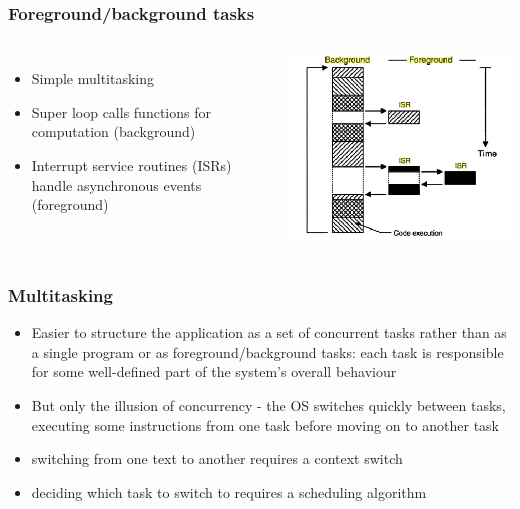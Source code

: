 \documentclass[hyperref={pdfpagelabels=false},svgnames]{beamer}
\begin{document}
\begin{frame}
\frametitle{Foreground/background tasks}
\begin{columns}[c]
\begin{itemize}
\item Simple multitasking
\item Super loop calls functions
for computation (background)
\item Interrupt service routines (ISRs) handle
asynchronous events (foreground)
\end{itemize}
\includegraphics[width=\textwidth]{fig1}
\end{columns}
\end{frame}

\begin{frame}
\frametitle{Multitasking}
\begin{itemize}
\item Easier to structure the application as a set of 
\alert{concurrent} tasks rather than as a single program or as
foreground/background tasks: each task is responsible for
some well-defined part of the system's overall behaviour
\item But only the illusion of concurrency - the OS
switches quickly between tasks, executing some instructions
from one task before moving on to another task
\item switching from one text to another requires a
\alert{context switch}
\item deciding which task to switch to requires a 
\alert{scheduling algorithm}
\end{itemize}
\end{frame}
\end{document}
